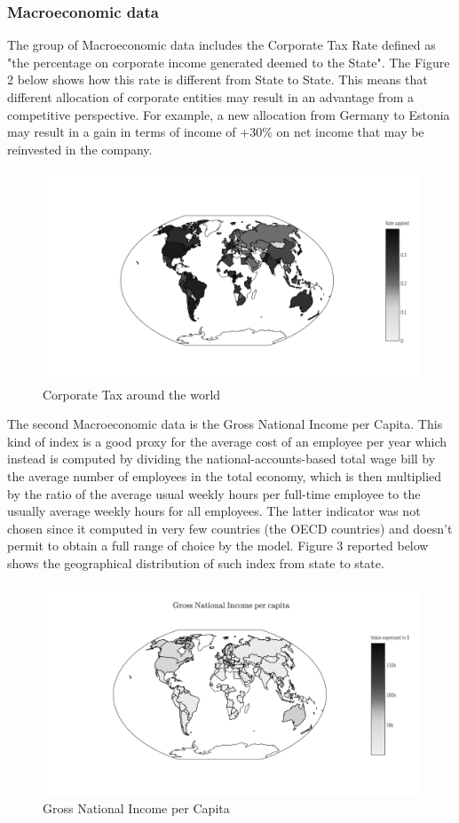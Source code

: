 \documentclass{article}
\begin{document}
\subsubsection{Macroeconomic data}
The group of Macroeconomic data includes the Corporate Tax Rate defined as "the percentage on corporate income generated deemed to the State". The Figure 2 below shows how this rate is different from State to State. This means that different allocation of corporate entities may result in an advantage from a competitive perspective. For example, a new allocation from Germany to Estonia may result in a gain in terms of income of +30\% on net income that may be reinvested in the company.
\begin{figure}
\centering
  \centering
  \includegraphics[width=1\linewidth]{Images/CTworld.png}
  \caption{Corporate Tax around the world}
  \label{fig:test1}
\end{figure}

The second Macroeconomic data is the Gross National Income per Capita. This kind of index is a good proxy for the average cost of an employee per year which instead is computed by dividing the national-accounts-based total wage bill by the average number of employees in the total economy, which is then multiplied by the ratio of the average usual weekly hours per full-time employee to the usually average weekly hours for all employees. The latter indicator was not chosen since it computed in very few countries (the OECD countries) and doesn't permit to obtain a full range of choice by the model. Figure 3 reported below shows the geographical distribution of such index from state to state.
\begin{figure}
  \centering
  \includegraphics[width=1\linewidth]{Images/GNIworld.png}
  \caption{Gross National Income per Capita}
  \label{fig:test2}
\end{figure}
\end{document}
